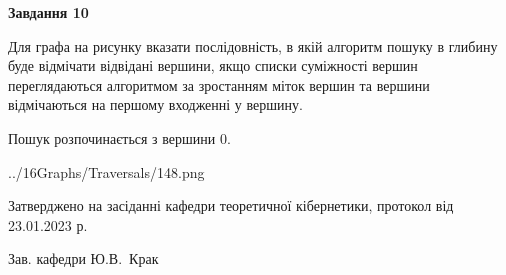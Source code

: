 \documentclass[12pt, ukrainian]{article}
\begin{document}
{\begin {large}
{\begin {center}\textbf{Завдання 10}\end {center}}\par
Для графа на рисунку вказати послідовність, в якій алгоритм пошуку в глибину буде відмічати відвідані вершини, якщо списки суміжності вершин переглядаються алгоритмом за зростанням міток вершин та вершини відмічаються на першому вход\-женні у вершину.\par
Пошук розпочинається з вершини 0.\par

\begin{center}
	{../16Graphs/Traversals/148.png}
\end{center}\par
\newpage


\end {large}
}
{\smallskip \begin {small} Затверджено на засіданні кафедри теоретичної кібернетики, протокол  від   23.01.2023 р.\par\smallskip\smallskip
{\parbox {6.5 cm}{Зав. кафедри \dotfill Ю.В.~Крак}} \end{small}}
\end{document}
